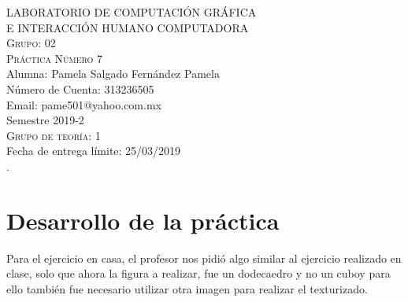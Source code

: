 \documentclass[12pt, a4paper]{article}
\begin{document}
\begin{titlepage}
		{\large LABORATORIO DE COMPUTACIÓN GRÁFICA\\ E INTERACCIÓN HUMANO COMPUTADORA}\\[.4 cm] %
		\textsc{\large Grupo: 02}\\[1.5 cm]
		\textsc{\large Práctica Número 7}\\[1.0 cm]
		{\large Alumna: Pamela Salgado Fernández Pamela}\\[.3 cm]
		{\large Número de Cuenta: 313236505}\\[.3 cm]
		{\large Email: pame501@yahoo.com.mx}\\[1.6 cm]
		\raggedleft 
		{\large Semestre 2019-2}\\[.3 cm]
		\textsc{\large Grupo de teoría: 1}\\[.3 cm]
		{\large Fecha de entrega límite: 25/03/2019}\\[.5 cm].

		
		\vfill %
		 
		
	\end{titlepage}
	\tableofcontents
	\newpage
	\noindent
\section{Desarrollo de la práctica}
\justify

Para el ejercicio en casa, el profesor nos pidió algo similar al ejercicio realizado en clase, solo que ahora la figura a realizar, fue un dodecaedro y no un cuboy para ello también fue necesario utilizar otra imagen para realizar el texturizado.\\[0.1cm]

\justify
\end{document}

